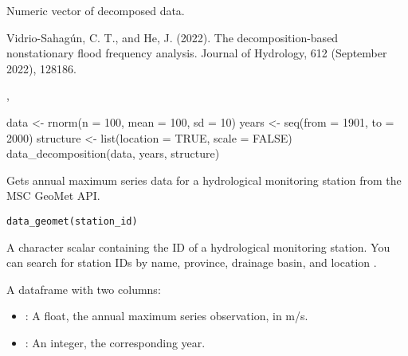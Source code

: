 \documentclass[a4paper]{book}
\begin{document}
%
\begin{Value}
Numeric vector of decomposed data.
\end{Value}
%
\begin{References}
Vidrio-Sahagún, C. T., and He, J. (2022). The decomposition-based nonstationary
flood frequency analysis. Journal of Hydrology, 612 (September 2022), 128186.
\end{References}
%
\begin{SeeAlso}
, 
\end{SeeAlso}
%
\begin{Examples}
\begin{ExampleCode}
data <- rnorm(n = 100, mean = 100, sd = 10)
years <- seq(from = 1901, to = 2000)
structure <- list(location = TRUE, scale = FALSE)
data_decomposition(data, years, structure)

\end{ExampleCode}
\end{Examples}
%
\begin{Description}
Gets annual maximum series data for a hydrological monitoring
station from the MSC GeoMet API.
\end{Description}
%
\begin{Usage}
\begin{verbatim}
data_geomet(station_id)
\end{verbatim}
\end{Usage}
%
\begin{Arguments}
\begin{ldescription}
\item[\code{station\_id}] A character scalar containing the ID of a hydrological monitoring station.
You can search for station IDs by name, province, drainage basin, and location
.
\end{ldescription}
\end{Arguments}
%
\begin{Value}
A dataframe with two columns:
\begin{itemize}

\item{} : A float, the annual maximum series observation, in m/s.
\item{} : An integer, the corresponding year.

\end{itemize}

\end{Value}
\end{document}
